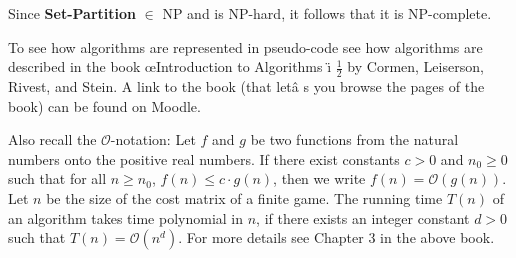 Since \textbf{Set-Partition} $\in $ NP and is NP-hard, it follows that it is
NP-complete.


\begin{remark}
To see how algorithms are represented in pseudo-code see how algorithms are
described in the book  \oe Introduction to Algorithms
\"{\i}\textquestiondown 
$\frac12$
by Cormen, Leiserson, Rivest, and Stein. A link to the book (that let\^{a}%
\texttrademark s you browse the pages of the book) can be found on
Moodle.

Also recall the $\mathcal{O}$-notation: Let $f$ and $g$ be two functions
from the natural numbers onto the positive real numbers. If there exist
constants $c>0$ and $n_{0}\geq 0$ such that for all $n\geq n_{0}$, $f(n)\leq
c\cdot g(n)$, then we write $f(n)=\mathcal{O}(g(n))$. Let $n$ be the size of
the cost matrix of a finite game. The running time $T(n)$ of an algorithm
takes time polynomial in $n$, if there exists an integer constant $d>0$ such
that $T(n)=\mathcal{O}(n^{d})$. For more details see Chapter 3 in the above
book.
\end{remark}

% 

